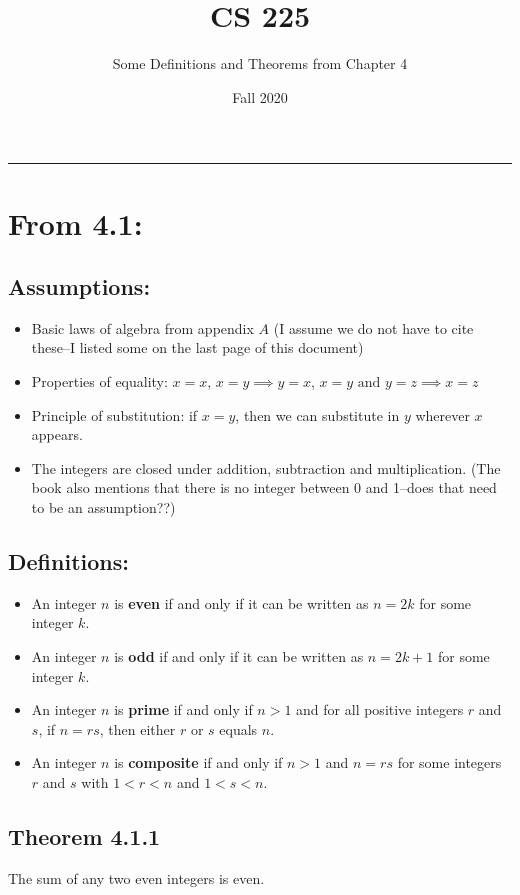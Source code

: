 \documentclass[11pt]{article}
\title{CS 225}
\author{Some Definitions and Theorems from Chapter 4}
\date{Fall 2020}
\begin{document}
\maketitle
\hrule

\section*{From 4.1:}
\subsection*{Assumptions:}
\begin{itemize}
    \item Basic laws of algebra from appendix $A$ (I assume we do not have to cite these--I listed some on
    the last page of this document)
    \item Properties of equality: $x = x$, $x = y \implies y = x$, $x = y \text{ and } y = z \implies x = z$
    \item Principle of substitution: if $x = y$, then we can substitute in $y$ wherever $x$ appears. 
    \item The integers are closed under addition, subtraction and multiplication. (The book also 
    mentions that there is no integer between 0 and 1--does that need to be an assumption??)
\end{itemize}

\subsection*{Definitions:}
\begin{itemize}
    \item An integer $n$ is {\bf even} if and only if 
    it can be written as $n = 2k$ for some integer $k$. 
    \item An integer $n$ is {\bf odd} if and only if 
    it can be written as $n = 2k + 1$ for some integer $k$. 
    \item An integer $n$ is {\bf prime} if and only if 
    $n > 1$ and for all positive integers $r$ and $s$, if 
    $n = rs$, then either $r$ or $s$ equals $n$. 
    \item An integer $n$ is {\bf composite} if and only if
    $n > 1$ and $n = rs$ for some integers $r$ and $s$ with
    $1< r< n$ and $1< s< n$. 
\end{itemize}

\subsection*{Theorem 4.1.1}
The sum of any two even integers is even. 
\end{document}
